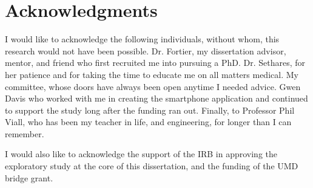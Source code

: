 \documentclass{umthesis}
\begin{document}
\chapter*{Acknowledgments}             %
  I would like to acknowledge the following individuals, without whom, this research would not have been possible. Dr. Fortier, my dissertation advisor, mentor, and friend who first recruited me into pursuing a PhD. Dr. Sethares, for her patience and for taking the time to educate me on all matters medical. My committee, whose doors have always been open anytime I needed advice. Gwen Davis who worked with me in creating the smartphone application and continued to support the study long after the funding ran out. Finally, to Professor Phil Viall, who has been my teacher in life, and engineering, for longer than I can remember. 
  
  I would also like to acknowledge the support of the IRB in approving the exploratory study at the core of this dissertation, and the funding of the UMD bridge grant.
  


\cleardoublepage
{}




\clearpage
\tableofcontents				 %
\clearpage
{}
{}
\listoffigures                  %



\mainmatter   %



\def \spo2{ \texorpdfstring{SpO$_{2}$}{SpO2}}









\end{document}
